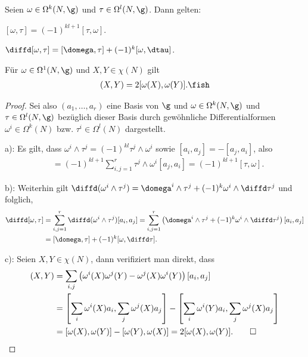 \documentclass[%
	paper=a5,%
	fleqn,%
	DIV=18,%
	BCOR=0mm,
	fontsize=11pt,
	titlepage=false,%
	bibliography=totoc,
	DIV=18,%
	twoside=true,
	pdftitle=Riemannsche Geometrie,
	pdfauthor=Uwe Semmelmann,
	numbers=noendperiod]%
	{scrbook}
\begin{document}
\begin{lem}
Seien $\omega\in\Omega^k(N,\g)$ und $\tau\in\Omega^l(N,\g)$. Dann gelten:
\begin{propenum}
\item $[\omega,\tau] = (-1)^{kl+1} [\tau,\omega]$.
\item $\diffd[\omega,\tau] = [\domega,\tau] + (-1)^k [\omega,\dtau]$.
\item Für $\omega \in\Omega^1(N,\g)$ und $X,Y\in\chi(N)$ gilt
\begin{align*}
[\omega,\omega](X,Y) = 2[\omega(X),\omega(Y)].\fish
\end{align*}
\end{propenum}
\end{lem}
\begin{proof}
Sei also $(a_1,\ldots,a_r)$ eine Basis von $\g$ und
$\omega\in\Omega^k(N,\g)$ und $\tau\in\Omega^l(N,\g)$  bezüglich dieser Basis
durch gewöhnliche Differentialformen $\omega^i\in\Omega^k(N)$ bzw.
$\tau^i\in\Omega^l(N)$ dargestellt.

a): Es gilt, dass $\omega^i\wedge \tau^j = (-1)^{kl}\tau^j\wedge\omega^i$ sowie
$[a_i,a_j] = -[a_j,a_i]$, also
\begin{align*}
[\omega,\tau] &=  (-1)^{kl+1} \sum_{i,j=1}^r \tau^j \wedge \omega^i [a_j,a_i]
= (-1)^{kl+1}[\tau,\omega].
\end{align*}

b): Weiterhin gilt
$\diffd(\omega^i\wedge \tau^j) = \domega^i \wedge \tau^j + (-1)^k \omega^i
\wedge \diffd\tau^j$ und folglich,
\begin{align*}
\diffd[\omega,\tau] &= \sum_{i,j=1}^r \diffd(\omega^i \wedge \tau^j) [a_i,a_j]
= \sum_{i,j=1}^r \left(\domega^i \wedge \tau^j + (-1)^k \omega^i
\wedge \diffd\tau^j\right) [a_i,a_j]\\
&= [\domega,\tau] + (-1)^k [\omega,\diffd\tau].
\end{align*}

c): Seien $X,Y\in\chi(N)$, dann verifiziert man direkt, dass
\begin{align*}
[\omega,\omega](X,Y) 
&=
\sum_{i,j} \left(\omega^i(X)\omega^j(Y)-\omega^j(X)\omega^i(Y)\right)
[a_i,a_j]\\
&= 
\left[\sum_i \omega^i(X) a_i, \sum_j \omega^j(X) a_j \right]
-
\left[\sum_i \omega^i(Y) a_i, \sum_j \omega^j(X) a_j \right]\\
&= [\omega(X),\omega(Y)]-[\omega(Y),\omega(X)]
= 2[\omega(X),\omega(Y)].\qed
\end{align*}
\end{proof}
\end{document}
